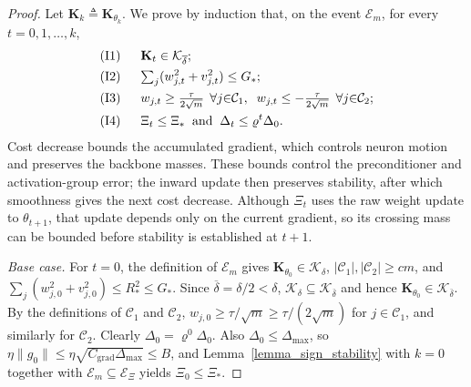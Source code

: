 \documentclass[letterpaper, 10 pt, conference]{ieeeconf}
\newcommand{\bK}{\mathbf{K}}
\newcommand{\cC}{\mathcal{C}}
\newcommand{\cE}{\mathcal{E}}
\newcommand{\cK}{\mathcal{K}}
\newcommand{\Lemm}{Lemma}
\begin{document}
\begin{proof}
    Let $\bK_{k} \triangleq \bK_{\theta_{k}}$. We prove by induction that, on the event $\cE_m$, for every $t=0, 1, \dots, k$,
    \begin{equation} \label{eq_main_induction_1}
        \begin{aligned}
        &\textup{(I1)} \;\; && \bK_t \in \cK_{\overline{\delta}};
        \\
        &\textup{(I2)} && {\textstyle\sum_{j}} (w_{j,t}^{2} + v_{j,t}^{2}) \le G_{\ast};
        \\
        &\textup{(I3)} && w_{j,t} \ge \tfrac{\tau}{2\sqrt{m}}\;\, \forall j {\in} \cC_{1},
                          \;\; w_{j,t} \le -\tfrac{\tau}{2\sqrt{m}}\;\, \forall j {\in} \cC_{2};
        \\
        &\textup{(I4)} && \Xi_{t} \le \Xi_{\ast}
                          \;\;\text{and}\;\; \Delta_{t} \le \varrho^{t}\Delta_{0}.
        \end{aligned}
    \end{equation}
Cost decrease bounds the accumulated gradient, which controls neuron motion and preserves the backbone masses. These bounds control the preconditioner and activation-group error; the inward
update then preserves stability, after which smoothness gives the next
cost decrease. Although $\Xi_t$ uses the raw weight update to
$\theta_{t+1}$, that update depends only on the current gradient, so its
crossing mass can be bounded before stability is established at $t+1$.

    \emph{Base case.} For $t = 0$, the definition of $\cE_m$ gives $\bK_{\theta_0} \in \cK_{\delta}$, $|\cC_{1}|, |\cC_{2}| \ge cm$, and $\sum_{j} (w_{j,0}^{2} + v_{j,0}^{2}) \le R_{\ast}^{2} \le G_{\ast}$. Since $\overline{\delta} = \delta/2 < \delta$, $\cK_{\delta} \subseteq \cK_{\overline\delta}$ and hence $\bK_{\theta_0} \in \cK_{\overline{\delta}}$. By the definitions of $\cC_1$ and $\cC_2$, $w_{j,0} \ge {\tau}/{\sqrt{m}} \ge {\tau}/{(2\sqrt{m})}$ for $j \in \cC_{1}$, and similarly for $\cC_{2}$. Clearly $\Delta_0=\varrho^0\Delta_0$. Also $\Delta_{0} \le \Delta_{\max}$, so $\eta \|g_0\| \le \eta \sqrt{C_{\mathrm{grad}}\Delta_{\max}} \le B$, and \Lemm~\ref{lemma_sign_stability} with $k = 0$ together with $\cE_m\subseteq\cE_{\Xi}$ yields $\Xi_{0} \le \Xi_{\ast}$.


\end{proof}
\end{document}

